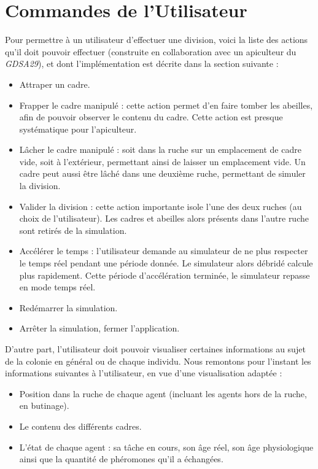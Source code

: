 		

	\section{Commandes de l'Utilisateur}
	
	Pour permettre à un utilisateur d'effectuer une division, voici la liste des actions qu'il doit pouvoir effectuer (construite en collaboration avec un apiculteur du \textit{GDSA29}), et dont l'implémentation est décrite dans la section suivante :
		\begin{itemize}
			\item Attraper un cadre.
			\item Frapper le cadre manipulé : cette action permet d'en faire tomber les abeilles, afin de pouvoir observer le contenu du cadre. Cette action est presque systématique pour l'apiculteur.
			\item Lâcher le cadre manipulé : soit dans la ruche sur un emplacement de cadre vide, soit à l'extérieur, permettant ainsi de laisser un emplacement vide. Un cadre peut aussi être lâché dans une deuxième ruche, permettant de simuler la division.
			\item Valider la division : cette action importante isole l'une des deux ruches (au choix de l'utilisateur). Les cadres et abeilles alors présents dans l'autre ruche sont retirés de la simulation.
			\item Accélérer le temps : l'utilisateur demande au simulateur de ne plus respecter le temps réel pendant une période donnée. Le simulateur alors débridé calcule plus rapidement. Cette période d'accélération terminée, le simulateur repasse en mode temps réel.
			\item Redémarrer la simulation.
			\item Arrêter la simulation, fermer l'application.		
		\end{itemize}	
		
		D'autre part, l'utilisateur doit pouvoir visualiser certaines informations au sujet de la colonie en général ou de chaque individu. Nous remontons pour l'instant les informations suivantes à l'utilisateur, en vue d'une visualisation adaptée :
		\begin{itemize}
			\item Position dans la ruche de chaque agent (incluant les agents hors de la ruche, en butinage).
			\item Le contenu des différents cadres.
			\item L'état de chaque agent : sa tâche en cours, son âge réel, son âge physiologique ainsi que la quantité de phéromones qu'il a échangées.
		\end{itemize}		

